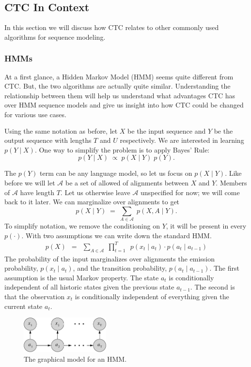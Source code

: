 \subsection{CTC In Context}

In this section we will discuss how CTC relates to other commonly used
algorithms for sequence modeling.

\subsubsection{HMMs}

At a first glance, a Hidden Markov Model (HMM) seems quite different from
CTC. But, the two algorithms are actually quite similar. Understanding the
relationship between them will help us understand what advantages CTC has over
HMM sequence models and give us insight into how CTC could be changed for
various use cases.

Using the same notation as before, let $X$ be the input sequence and $Y$ be the
output sequence with lengths $T$ and $U$ respectively. We are interested in
learning $p(Y \mid X)$. One way to simplify the problem is to apply Bayes'
Rule:
\[
p(Y \mid X) \; \propto \; p(X \mid Y) \; p(Y).
\]

The $p(Y)$ term can be any language model, so let us focus on $p(X \mid Y)$.
Like before we will let $\mathcal{A}$ be a set of allowed of alignments between
$X$ and $Y$. Members of $\mathcal{A}$ have length $T$. Let us otherwise leave
$\mathcal{A}$ unspecified for now; we will come back to it later. We can
marginalize over alignments to get
\[
p(X \mid Y)\; = \; \sum_{A \in \mathcal{A}} \; p(X, A \mid Y).
\]
To simplify notation, we remove the conditioning on $Y$, it will be present in
every $p(\cdot)$. With two assumptions we can write down the standard HMM.
\begin{align*}
p(X) \enspace = \enspace \sum_{A \in \mathcal{A}} \; \prod_{t=1}^T \enspace
                p(x_t \mid a_t) \cdot p(a_t \mid a_{t-1})
\end{align*}
The probability of the input marginalizes over alignments the emission
probability, $p(x_t \mid a_t)$, and the transition probability, $p(a_t \mid
a_{t-1})$. The first assumption is the usual Markov property. The state $a_t$
is conditionally independent of all historic states given the previous state
$a_{t-1}$. The second is that the observation $x_t$ is conditionally
independent of everything given the current state $a_t$.

\begin{figure}
\centering
\includegraphics[width=0.4\textwidth]{background/figures/hmm.pdf}
\caption{The graphical model for an HMM.}
\end{figure}

